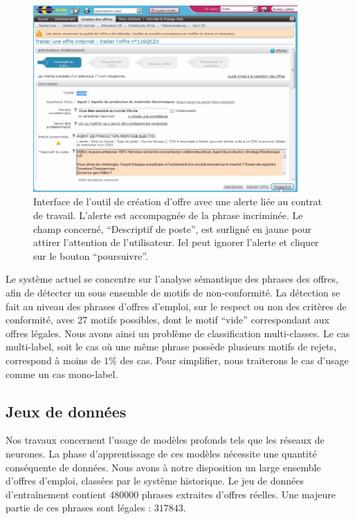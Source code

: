 \begin{figure}[htpb!]
    \centering
    \includegraphics[width=0.9\textwidth]{S2-Explicabilite_locale/figures/Dune.png}
    \caption{Interface de l'outil de création d'offre avec une alerte liée au contrat de travail. L'alerte est accompagnée de la phrase incriminée. Le champ concerné, ``Descriptif de poste'', est surligné en jaune pour attirer l'attention de l'utilisateur. Iel peut ignorer l'alerte et cliquer sur le bouton ``poursuivre''.}
    \label{fig:ihm_DUNE}
\end{figure}

Le système actuel se concentre sur l’analyse sémantique des phrases des offres, afin de détecter un sous ensemble de motifs de non-conformité. La détection se fait au niveau des phrases d'offres d'emploi, sur le respect ou non des critères de conformité, avec 27 motifs possibles, dont le motif ``vide'' correspondant aux offres légales. Nous avons ainsi un problème de classification multi-classes. Le cas multi-label, soit le cas où une même phrase possède plusieurs motifs de rejets, correspond à moins de $1\%$ des cas. Pour simplifier, nous traiterons le cas d'usage comme un cas mono-label.

\subsection{Jeux de données} \label{C2:datasets}

Nos travaux concernent l'usage de modèles profonds tels que les réseaux de neurones. La phase d'apprentissage de ces modèles nécessite une quantité conséquente de données. Nous avons à notre disposition un large ensemble d'offres d'emploi, classées par le système historique.
Le jeu de données d'entraînement contient $480 000$ phrases extraites d'offres réelles. Une majeure partie de ces phrases sont légales : $317 843$.

